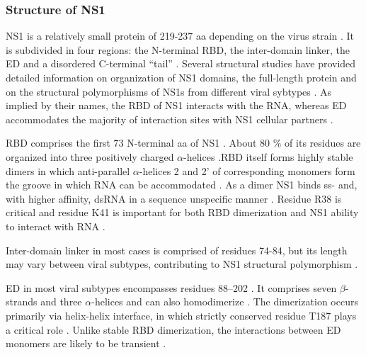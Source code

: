 		
		\subsubsection{Structure of NS1}
		
		\gls{NS1} is a relatively small protein of 219-237 \gls{aa} depending on the virus strain \parencite{Hale2008b}. It is subdivided in four regions: the N-terminal \gls{RBD}, the inter-domain linker, the \gls{ED} and a disordered C-terminal ``tail'' \parencite{Hale2014}. Several structural studies have provided detailed information on organization of \gls{NS1} domains, the full-length protein and on the structural polymorphisms of \gls{NS1}s from different viral sybtypes \parencite{Chien1997, Liu1997a, Wang1999a, Bornholdt2006, Yin2007a, Hale2008c, Cheng2009, Xia2009, Kerry2011, Carrillo2014}. As implied by their names, the \gls{RBD} of NS1 interacts with the RNA, whereas \gls{ED} accommodates the majority of interaction sites with \gls{NS1} cellular partners \parencite{Hale2008b}.
		
		\gls{RBD} comprises the first 73 N-terminal aa of \gls{NS1} \parencite{Qian1995a, Yin2007a}. About 80 \% of its residues are organized into three positively charged $\alpha$-helices \parencite{Qian1995a, Liu1997a}.\gls{RBD} itself forms highly stable dimers in which anti-parallel $\alpha$-helices 2 and 2' of corresponding monomers form the groove in which RNA can be accommodated \parencite{Chien1997, Wang1999a}. As a dimer NS1 binds ss- and, with higher affinity, dsRNA in a sequence unspecific manner \parencite{Hatada1992, Chien1997, Qian1995}. Residue R38 is critical and residue K41 is important for both \gls{RBD} dimerization and \gls{NS1} ability to interact with RNA \parencite{Hatada1992, Wang1999a}.
		
		Inter-domain linker in most cases is comprised of residues 74-84, but its length may vary between viral subtypes, contributing to \gls{NS1} structural polymorphism \parencite{Bornholdt2006, Carrillo2014, Kerry2011}.
		
		\gls{ED} in most viral subtypes encompasses residues 88--202 \parencite{Hale2014}. It comprises seven $\beta$-strands and three $\alpha$-helices and can also homodimerize \parencite{Bornholdt2006, Hale2008c, Xia2009}. The dimerization occurs primarily via helix-helix interface, in which strictly conserved residue T187 plays a critical role \parencite{Hale2008c, Kerry2011}. Unlike stable \gls{RBD} dimerization, the interactions between \gls{ED} monomers are likely to be transient \parencite{Kerry2011, Hale2014}.
		
